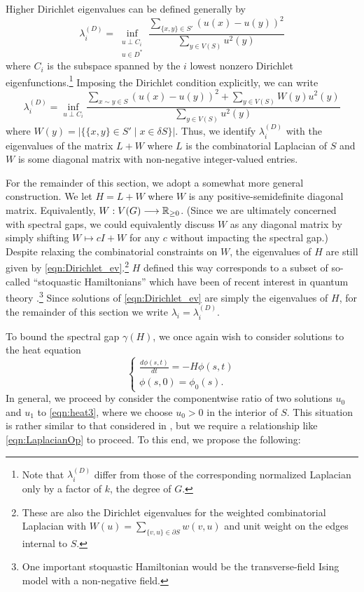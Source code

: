 Higher Dirichlet eigenvalues can be defined generally by
\begin{equation*}
	\lambda^{(D)}_i = \inf_{\substack{u \perp C_i \\ u \in D^{*}}}\frac{\displaystyle\sum_{\{x,y\} \in S'}\left(u(x)-u(y)\right)^2}{\displaystyle\sum_{y \in V(S)} u^2(y)}
\end{equation*}
where $C_i$ is the subspace spanned by the $i$ lowest nonzero Dirichlet eigenfunctions.\footnote{Note that $\lambda^{(D)}_i$ differ from those of the corresponding normalized Laplacian only by a factor of $k$, the degree of $G$.} Imposing the Dirichlet condition explicitly, we can write
\begin{equation}\label{eqn:Dirichlet_ev}
	\lambda^{(D)}_{i} = \inf_{u \perp C_i}\frac{\displaystyle\sum_{x \sim y \in S}\left(u(x)-u(y)\right)^2 + \sum_{y \in V(S)} W(y) u^2(y)}{\displaystyle\sum_{y \in V(S)} u^2(y)}
\end{equation}
where $W(y)=\lvert \{\{x,y\}\in S' \; \vert \; x \in \delta S \}\rvert$. Thus, we identify $\lambda^{(D)}_i$ with the eigenvalues of the matrix $L+W$ where $L$ is the combinatorial Laplacian of $S$ and $W$ is some diagonal matrix with non-negative integer-valued entries. 

For the remainder of this section, we adopt a somewhat more general construction. We let $H = L + W$ where $W$ is any positive-semidefinite diagonal matrix. Equivalently, $W:V(G) \longrightarrow \allowbreak \mathbb{R}_{\geq 0}$. (Since we are ultimately concerned with spectral gaps, we could equivalently discuss $W$ as any diagonal matrix by simply shifting $W\mapsto c I + W$ for any $c$ without impacting the spectral gap.) Despite relaxing the combinatorial constraints on $W$, the eigenvalues of $H$ are still given by \cref{eqn:Dirichlet_ev}.\footnote{These are also the Dirichlet eigenvalues for the weighted combinatorial Laplacian with $\displaystyle W(u) = \sum_{\{v,u\} \in \partial S} w(v,u)$ and unit weight on the edges internal to $S$.} $H$ defined this way corresponds to a subset of so-called ``stoquastic Hamiltonians'' which have been of recent interest in quantum theory \cite{Bravyi2006a}.\footnote{One important stoquastic Hamiltonian would be the transverse-field Ising model with a non-negative field.} Since solutions of \cref{eqn:Dirichlet_ev} are simply the eigenvalues of $H$, for the remainder of this section we write $\lambda_{i} = \lambda^{(D)}_i$.

To bound the spectral gap $\gamma(H)$, we once again wish to consider solutions to the heat equation
\begin{equation}\label{eqn:heat3}
    \begin{cases}
    	\frac{d\phi(s,t)}{dt} = - H \phi(s,t) \\
    	\phi(s,0) = \phi_0(s).
    \end{cases}
\end{equation}
In general, we proceed by consider the componentwise ratio of two solutions $u_0$ and $u_1$ to \cref{eqn:heat3}, where we choose $u_0 > 0$ in the interior of $S$. This situation is rather similar to that considered in , but we require a relationship like \cref{eqn:LaplacianOp} to proceed. To this end, we propose the following:

